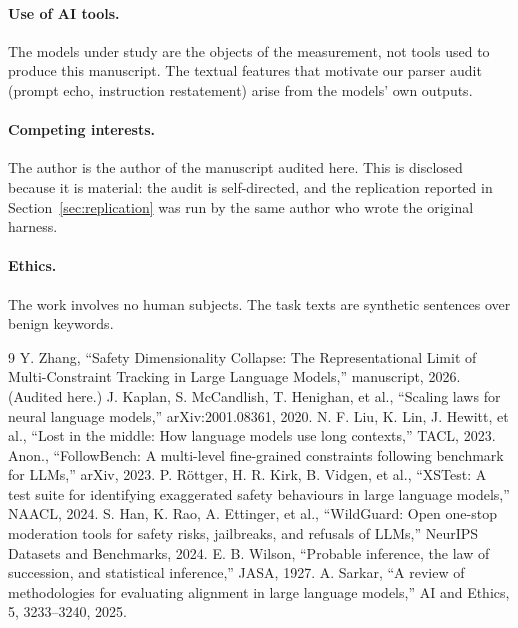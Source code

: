 \documentclass[preprint,12pt]{elsarticle}
\theoremstyle{plain}
\begin{document}
\paragraph{Use of AI tools.} The models under study are the objects of the measurement, not tools used to produce this manuscript. The textual features that motivate our parser audit (prompt echo, instruction restatement) arise from the models' own outputs.
\paragraph{Competing interests.} The author is the author of the manuscript audited here. This is disclosed because it is material: the audit is self-directed, and the replication reported in Section~\ref{sec:replication} was run by the same author who wrote the original harness.
\paragraph{Ethics.} The work involves no human subjects. The task texts are synthetic sentences over benign keywords.

\begin{thebibliography}{9}
 Y. Zhang, ``Safety Dimensionality Collapse: The Representational Limit of Multi-Constraint Tracking in Large Language Models,'' manuscript, 2026. (Audited here.)
 J. Kaplan, S. McCandlish, T. Henighan, et al., ``Scaling laws for neural language models,'' arXiv:2001.08361, 2020.
 N. F. Liu, K. Lin, J. Hewitt, et al., ``Lost in the middle: How language models use long contexts,'' TACL, 2023.
 Anon., ``FollowBench: A multi-level fine-grained constraints following benchmark for LLMs,'' arXiv, 2023.
 P. R\"ottger, H. R. Kirk, B. Vidgen, et al., ``XSTest: A test suite for identifying exaggerated safety behaviours in large language models,'' NAACL, 2024.
 S. Han, K. Rao, A. Ettinger, et al., ``WildGuard: Open one-stop moderation tools for safety risks, jailbreaks, and refusals of LLMs,'' NeurIPS Datasets and Benchmarks, 2024.
 E. B. Wilson, ``Probable inference, the law of succession, and statistical inference,'' JASA, 1927.
 A. Sarkar, ``A review of methodologies for evaluating alignment in large language models,'' AI and Ethics, 5, 3233--3240, 2025.
\end{thebibliography}
\end{document}
